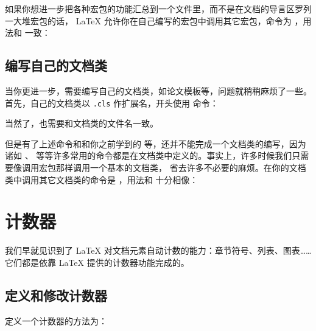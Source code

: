 如果你想进一步把各种宏包的功能汇总到一个文件里，而不是在文档的导言区罗列一大堆宏包的话，
\LaTeX{} 允许你在自己编写的宏包中调用其它宏包，命令为 ，用法和 
一致：
\begin{command}
\end{command}

\subsection{编写自己的文档类}\label{subsec:provide-cls}

当你更进一步，需要编写自己的文档类，如论文模板等，问题就稍稍麻烦了一些。首先，自己的文档类以 \texttt{.cls} 作扩展名，开头使用
 命令：
\begin{command}
\end{command}
当然了，也需要和文档类的文件名一致。

但是有了上述命令和和你之前学到的  等，还并不能完成一个文档类的编写，因为诸如 、
 等等许多常用的命令都是在文档类中定义的。事实上，许多时候我们只需要像调用宏包那样调用一个基本的文档类，
省去许多不必要的麻烦。在你的文档类中调用其它文档类的命令是 ，用法和  十分相像：
\begin{command}
\end{command}

\section{计数器}\label{sec:counters}

我们早就见识到了 \LaTeX{} 对文档元素自动计数的能力：章节符号、列表、图表……它们都是依靠 \LaTeX{} 提供的计数器功能完成的。

\subsection{定义和修改计数器}\label{subsec:count-defs}

定义一个计数器的方法为：
\begin{command}
\end{command}

